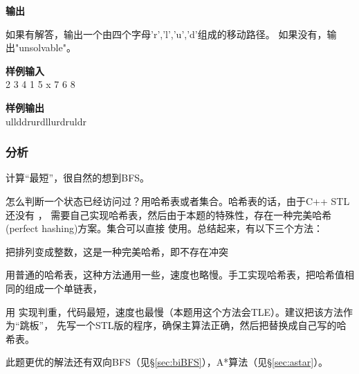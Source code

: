\textbf{输出}

如果有解答，输出一个由四个字母'r','l','u','d'组成的移动路径。
如果没有，输出"unsolvable"。 

\textbf{样例输入} \\
2  3  4  1  5  x  7  6  8

\textbf{样例输出} \\
ullddrurdllurdruldr

\subsubsection{分析}
计算“最短”，很自然的想到BFS。

怎么判断一个状态已经访问过？用哈希表或者集合。哈希表的话，由于C++ STL 还没有 ，
需要自己实现哈希表，然后由于本题的特殊性，存在一种完美哈希(perfect hashing)方案。集合可以直接
使用。总结起来，有以下三个方法：
\begindot
\item 把排列变成整数，这是一种完美哈希，即不存在冲突
\item 用普通的哈希表，这种方法通用一些，速度也略慢。手工实现哈希表，把哈希值相同的组成一个单链表，
\item 用  实现判重，代码最短，速度也最慢（本题用这个方法会TLE）。建议把该方法作为“跳板”，
先写一个STL版的程序，确保主算法正确，然后把替换成自己写的哈希表。
\myenddot

此题更优的解法还有双向BFS（见\S \ref{sec:biBFS}），A*算法（见\S \ref{sec:astar}）。

